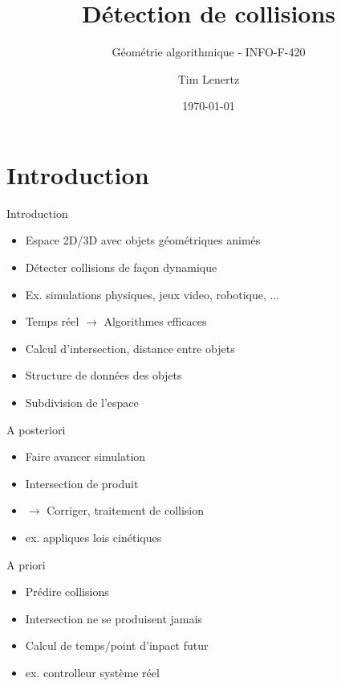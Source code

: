 \documentclass{beamer}
\title{Détection de collisions}
\subtitle{Géométrie algorithmique - INFO-F-420}
\author{Tim Lenertz}
\institute{ULB, MA1 INFO}
\date{\today}
\begin{document}
\begin{frame}
	\titlepage
\end{frame}

\begin{frame}
	\tableofcontents
\end{frame}

\section{Introduction}

\begin{frame}{Introduction}
	\begin{itemize}
	\item Espace 2D/3D avec objets géométriques animés
	\item Détecter collisions de façon dynamique
	\item Ex. simulations physiques, jeux video, robotique, ...
	\item Temps réel $\rightarrow$ Algorithmes efficaces
	\item Calcul d'intersection, distance entre objets
	\item Structure de données des objets
	\item Subdivision de l'espace
	\end{itemize}
\end{frame}

\begin{frame}{A posteriori}
	\begin{itemize}
	\item Faire avancer simulation
	\item Intersection de produit
	\item $\rightarrow$ Corriger, traitement de collision
	\item ex. appliques lois cinétiques
	\end{itemize}
\end{frame}

\begin{frame}{A priori}
	\begin{itemize}
	\item Prédire collisions
	\item Intersection ne se produisent jamais
	\item Calcul de temps/point d'inpact futur
	\item ex. controlleur système réel
	\end{itemize}
\end{frame}
\end{document}

